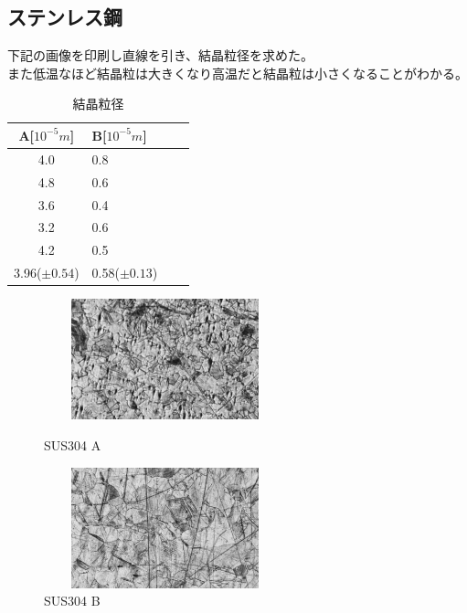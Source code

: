 \documentclass{jsarticle}
\begin{document}
\subsection{ステンレス鋼}
下記の画像を印刷し直線を引き、結晶粒径を求めた。\\
また低温なほど結晶粒は大きくなり高温だと結晶粒は小さくなることがわかる。\\
\begin{table}[h]
\caption{結晶粒径}
 \label{table:SpeedOfLight}
 \centering
  \begin{tabular}{clll}
   \hline
   A[$10^{-5}m$] & B[$10^{-5}m$] \\
   \hline \hline
   4.0 & 0.8\\
   4.8 & 0.6\\
   3.6 & 0.4\\
   3.2 & 0.6\\
   4.2 & 0.5\\
   \hline
   3.96($\pm0.54$) & 0.58($\pm0.13$) \\
  \end{tabular}
\end{table}
\begin{figure}[htbp]
 \begin{minipage}{0.5\hsize}
  \begin{center}
   \includegraphics[width=70mm,height=35mm]{pictures/SUS_A_x50_BF.bmp}
  \end{center}
  \caption{SUS304 A}
  \label{fig:one}
 \end{minipage}
 \begin{minipage}{0.5\hsize}
  \begin{center}
   \includegraphics[width=70mm,height=35mm]{pictures/SUS_B_x50_BF.bmp}
  \end{center}
  \caption{SUS304 B}
  \label{fig:two}
 \end{minipage}
\end{figure}
\end{document}
